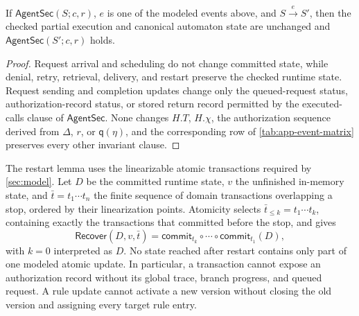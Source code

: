 \begin{lemma}
\label{lem:app-uncontrollable}
If \(\mathsf{AgentSec}(S;c,r)\), \(e\) is one of the modeled events above, and \(S\xrightarrow eS'\), then the checked partial execution and canonical automaton state are unchanged and \(\mathsf{AgentSec}(S';c,r)\) holds.
\end{lemma}

\begin{proof}
Request arrival and scheduling do not change committed state, while denial, retry, retrieval, delivery, and restart preserve the checked runtime state.
Request sending and completion updates change only the queued-request status, authorization-record status, or stored return record permitted by the executed-calls clause of \(\mathsf{AgentSec}\).
None changes \(H.T\), \(H.\chi\), the authorization sequence derived from \(\Delta\), \(r\), or \(\mathsf q(\eta)\), and the corresponding row of \cref{tab:app-event-matrix} preserves every other invariant clause.
\end{proof}

The restart lemma uses the linearizable atomic transactions required by \cref{sec:model}.
Let \(D\) be the committed runtime state, \(v\) the unfinished in-memory state, and \(\bar t=t_1\cdots t_n\) the finite sequence of domain transactions overlapping a stop, ordered by their linearization points.
Atomicity selects \(\bar t_{\leq k}=t_1\cdots t_k\), containing exactly the transactions that committed before the stop, and gives
\[
\mathsf{Recover}(D,v,\bar t)
 =\mathsf{commit}_{t_k}\circ\cdots\circ
   \mathsf{commit}_{t_1}(D),
\]
with \(k=0\) interpreted as \(D\).
No state reached after restart contains only part of one modeled atomic update.
In particular, a \Fresh transaction cannot expose an authorization record without its global trace, branch progress, and queued request.
A rule update cannot activate a new version without closing the old version and assigning every target rule entry.


